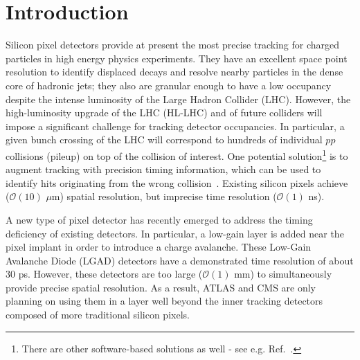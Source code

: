 \documentclass[aps,pt14,superscriptaddress,floatfix,nofootinbib]{revtex4}
\begin{document}
\date{\today}
\maketitle

\section{Introduction}

Silicon pixel detectors provide at present the most precise tracking for charged particles in high energy physics experiments. They have an excellent space point resolution to identify displaced decays and resolve nearby particles in the dense core of hadronic jets; they also are granular enough to have a low occupancy despite the intense luminosity of the Large Hadron Collider (LHC).    However, the high-luminosity upgrade of the LHC (HL-LHC) and of future colliders will impose a significant challenge for tracking detector occupancies.  In particular, a given bunch crossing of the LHC will correspond to hundreds of individual $pp$ collisions (pileup) on top of the collision of interest. One potential solution\footnote{There are other software-based solutions as well - see e.g. Ref.~\cite{2012.04533}.} is to augment tracking with precision timing information, which can be used to identify hits originating from the wrong collision~\cite{Sadrozinski:2017qpv,CERN-LHCC-2017-027,CERN-LHCC-2018-023}.  Existing silicon pixels achieve ($\mathcal{O}(10)$ $\mu$m) spatial resolution, but imprecise time resolution ($\mathcal{O}(1)$ ns).

A new type of pixel detector has recently emerged to address the timing deficiency of existing detectors.   In particular, a low-gain layer is added near the pixel implant in order to introduce a charge avalanche.  These Low-Gain Avalanche Diode (LGAD) detectors have a demonstrated time resolution of about 30 ps.  However, these detectors  are too large ($\mathcal{O}(1)$ mm) to simultaneously provide precise spatial resolution.  As a result, ATLAS and CMS are only planning on using them in a layer well beyond the inner tracking detectors composed of more traditional silicon pixels.

\end{document}
